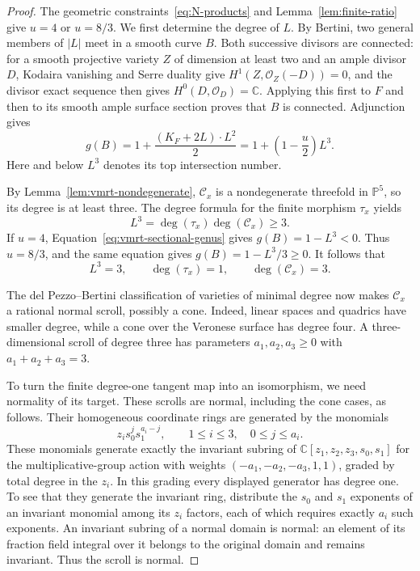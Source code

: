 \begin{proof}
The geometric constraints~\eqref{eq:N-products} and
Lemma~\ref{lem:finite-ratio} give $u=4$ or $u=8/3$. We first determine
the degree of $L$.  By Bertini, two general members of $|L|$ meet in a smooth
curve $B$.  Both successive divisors are connected:
for a smooth projective variety $Z$ of dimension at least two and an
ample divisor $D$, Kodaira vanishing and Serre duality give
$H^1(Z,\mathcal O_Z(-D))=0$, and the divisor exact sequence then gives
$H^0(D,\mathcal O_D)=\mathbb C$.  Applying this first to $F$ and then
to its smooth ample surface section proves that $B$ is connected.
Adjunction gives
\begin{equation}\label{eq:vmrt-sectional-genus}
 g(B)=1+\frac{(K_F+2L)\cdot L^2}{2}
     =1+\left(1-\frac u2\right)L^3.
\end{equation}
Here and below $L^3$ denotes its top intersection number.

By Lemma~\ref{lem:vmrt-nondegenerate}, $\mathcal C_x$ is a
nondegenerate threefold in $\mathbb P^5$, so its degree is at least
three.  The degree formula for the finite morphism $\tau_x$ yields
\[
 L^3=\deg(\tau_x)\deg(\mathcal C_x)\geq3.
\]
If $u=4$, Equation~\eqref{eq:vmrt-sectional-genus} gives
$g(B)=1-L^3<0$.  Thus $u=8/3$, and the same equation gives
$g(B)=1-L^3/3\geq0$.  It follows that
\[
 L^3=3,\qquad\deg(\tau_x)=1,\qquad\deg(\mathcal C_x)=3.
\]

The del Pezzo--Bertini classification of varieties of minimal degree
\cite[Theorem~0.1]{EisenbudGreenHulekPopescu2006} now makes
$\mathcal C_x$ a rational normal scroll, possibly a cone.  Indeed,
linear spaces and quadrics have smaller degree, while a cone over the
Veronese surface has degree four.  A three-dimensional scroll of
degree three has parameters $a_1,a_2,a_3\geq0$ with
$a_1+a_2+a_3=3$.

To turn the finite degree-one tangent map into an isomorphism, we need
normality of its target. These scrolls are normal, including the cone
cases, as follows. Their homogeneous coordinate rings are generated
by the monomials
\[
 z_i s_0^j s_1^{a_i-j},\qquad
 1\leq i\leq3,\quad0\leq j\leq a_i.
\]
These monomials generate exactly the invariant subring of
$\mathbb C[z_1,z_2,z_3,s_0,s_1]$ for the multiplicative-group action
with weights $(-a_1,-a_2,-a_3,1,1)$, graded by total degree in the
$z_i$. In this grading every displayed generator has degree one.
To see that they generate the invariant ring, distribute the
$s_0$ and $s_1$ exponents of an invariant monomial among its $z_i$
factors, each of which requires exactly $a_i$ such exponents.  An
invariant subring of a normal domain is normal: an element of its
fraction field integral over it belongs to the original domain and
remains invariant.  Thus the scroll is normal.


\end{proof}
